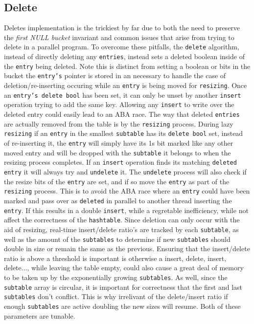 \subsection{Delete}
Deletes implementation is the trickiest by far due to both the need to
preserve the \textit{first NULL bucket} invariant and common issues
that arise from trying to delete in a parallel program. To overcome
these pitfalls, the \texttt{delete} algorithm, instead of directly
deleting any \texttt{entries}, instead sets a deleted boolean inside
of the \texttt{entry} being deleted. Note this is distinct from
setting a boolean or bits in the bucket the \texttt{entry's} pointer
is stored in an necessary to handle the case of deletion/re-inserting
occuring while an \texttt{entry} is being moved for
\texttt{resizing}. Once an \texttt{entry's delete bool} has been set,
it can only be unset by another \texttt{insert} operation trying to
add the same key. Allowing any \texttt{insert} to write over the
deleted entry could easily lead to an ABA race. The way that deleted
\texttt{entries} are actually removed from the table is by the
\texttt{resizing} process. During lazy \texttt{resizing} if an
\texttt{entry} in the smallest \texttt{subtable} has its
\texttt{delete bool} set, instead of re-inserting it, the
\texttt{entry} will simply have its 1s bit marked like any other moved
entry and will be dropped with the \texttt{subtable} it belongs to
when the resizing process completes. If an \texttt{insert} operation
finds its matching \texttt{deleted entry} it will always try and
\texttt{undelete} it. The \texttt{undelete} process will also check if
the resize bits of the \texttt{entry} are set, and if so move the
\texttt{entry} as part of the \texttt{resizing} process. This is to
avoid the ABA race where an \texttt{entry} could have been marked and
pass over as \texttt{deleted} in parallel to another thread inserting
the \texttt{entry}. If this results in a double \texttt{insert}, while
a regretable inefficiency, while not affect the correctness of the
\texttt{hashtable}. Since deletion can only occur with the aid of
resizing, real-time insert/delete ratio's are tracked by each
\texttt{subtable}, as well as the amount of the \texttt{subtables} to
determine if new \texttt{subtables} should double in size or remain
the same as the previous. Ensuring that the insert/delete ratio is
above a threshold is important is otherwise a insert, delete, insert,
delete..., while leaving the table empty, could also cause a great
deal of memory to be taken up by the exponentially growing
\texttt{subtables}. As well, since the \texttt{subtable} array is
circular, it is important for correctness that the first and last
\texttt{subtables} don't conflict. This is why irrelivant of the
delete/insert ratio if enough \texttt{subtables} are active doubling
the new sizes will resume. Both of these parameters are tunable.








